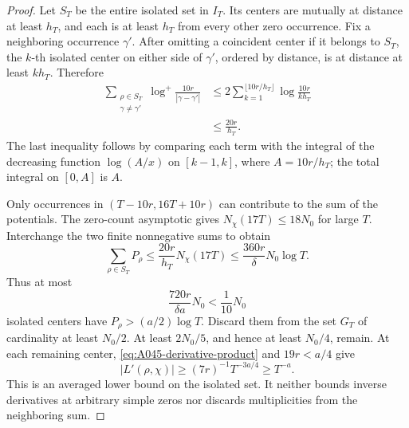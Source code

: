 \begin{proof}
Let \(S_T\) be the entire isolated set in \(I_T\).
Its centers are mutually at distance at least \(h_T\), and
each is at least \(h_T\) from every other zero occurrence.
Fix a neighboring occurrence \(\gamma'\).
After omitting a coincident center if it belongs to \(S_T\),
the \(k\)-th isolated center on either side of \(\gamma'\),
ordered by distance, is at distance at least \(kh_T\).
Therefore
\[
 \begin{aligned}
 \sum_{\substack{\rho\in S_T\\\gamma\ne\gamma'}}
             \log^+\frac{10r}{|\gamma-\gamma'|}
 &\le 2\sum_{k=1}^{\lfloor10r/h_T\rfloor}
                         \log\frac{10r}{kh_T}\\
 &\le\frac{20r}{h_T}.
 \end{aligned}
\]
The last inequality follows by comparing each term with the
integral of the decreasing function
\(\log(A/x)\) on \([k-1,k]\), where \(A=10r/h_T\);
the total integral on \([0,A]\) is \(A\).

Only occurrences in \((T-10r,16T+10r)\) can contribute
to the sum of the potentials. The zero-count asymptotic gives
\(N_\chi(17T)\le18N_0\) for large \(T\). Interchange the
two finite nonnegative sums to obtain
\[
                    \sum_{\rho\in S_T}P_\rho
         \le\frac{20r}{h_T}N_\chi(17T)
         \le\frac{360r}{\delta}N_0\log T.
\]
Thus at most
\[
               \frac{720r}{\delta a}N_0
                               <\frac1{10}N_0
\]
isolated centers have \(P_\rho>(a/2)\log T\).
Discard them from the set \(G_T\) of cardinality at least
\(N_0/2\). At least \(2N_0/5\), and hence at least
\(N_0/4\), remain. At each remaining center,
\eqref{eq:A045-derivative-product} and \(19r<a/4\) give
\[
 |L'(\rho,\chi)|\ge(7r)^{-1}T^{-3a/4}\ge T^{-a}.
\]
This is an averaged lower bound on the isolated set.
It neither bounds inverse derivatives at arbitrary simple
zeros nor discards multiplicities from the neighboring sum.
\end{proof}

